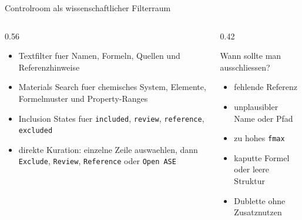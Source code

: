 \documentclass[aspectratio=169,10pt]{beamer}
\begin{document}
\begin{frame}{Controlroom als wissenschaftlicher Filterraum}
  \begin{columns}[T,totalwidth=\textwidth]
    \begin{column}{0.56\textwidth}
      \begin{itemize}
        \item Textfilter fuer Namen, Formeln, Quellen und Referenzhinweise
        \item Materials Search fuer chemisches System, Elemente, Formelmuster und Property-Ranges
        \item Inclusion States fuer \texttt{included}, \texttt{review}, \texttt{reference}, \texttt{excluded}
        \item direkte Kuration: einzelne Zeile auswaehlen, dann \texttt{Exclude}, \texttt{Review}, \texttt{Reference} oder \texttt{Open ASE}
      \end{itemize}
    \end{column}
    \begin{column}{0.42\textwidth}
      \begin{block}{Wann sollte man ausschliessen?}
        \begin{itemize}
          \item fehlende Referenz
          \item unplausibler Name oder Pfad
          \item zu hohes \texttt{fmax}
          \item kaputte Formel oder leere Struktur
          \item Dublette ohne Zusatznutzen
        \end{itemize}
      \end{block}
    \end{column}
  \end{columns}
\end{frame}
\end{document}
